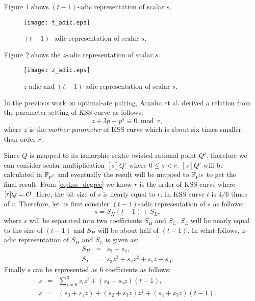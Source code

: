 Figure \ref{fig:t_adic} shows $(t-1)$-adic representation of scalar $s$. 
\begin{figure}[!ht]
\centering
\texttt{[image: t\_adic.eps]}
\caption{$(t-1)$ -adic representation of scalar $s$.}
\label{fig:t_adic}
\end{figure}

Figure \ref{fig:z_adicl} shows the  $z$-adic representation of scalar $s$. 
\begin{figure}[!ht]
\centering
\texttt{[image: z\_adic.eps]}
\caption{$z$-adic and $(t-1)$-adic representation of scalar $s$.}
\label{fig:z_adicl}
\end{figure}
In the previous work on optimal-ate pairing, Aranha et al. \cite{aranha} derived a relation from the parameter setting of KSS curve as follows:
\begin{equation}\label{eq:aranha_relation}
z+3p-p^4 \equiv 0 \bmod {r},
\end{equation}
where $z$ is the \textit{mother parameter} of KSS curve which is about six times smaller than order $r$. 

Since $Q$ is mapped to its ismorphic sextic twisted rational point $Q'$, therefore we can consider scalar multiplication $[s]Q'$ where $0 \leq s < r$. $[s]Q'$ will be calculated in $\mathbb{F}_{p^3}$ and eventually the result will be mapped to $\mathbb{F}_{p^{18}}$ to get the final result. From \eqref{eq:kss_degree} we know $r$ is the order of KSS curve  where $[r]Q=\cal O$. Here, the bit size of $s$ is nearly equal to $r$. In KSS curve $t$ is  $4/6$ times of  $r$. Therefore, let us first consider $(t-1)$-adic representation of $s$ as follows:
\begin{equation}\label{eq:t-1_adic}
s =  S_H(t-1)+S_L,
\end{equation}
where $s$ will be separated into two coefficients $S_H$ and $S_L$. $S_L$ will be nearly equal to the size of $(t-1)$ and $S_H$ will be about half of $(t-1)$. 
In what follows, $z$-adic representation of $S_H$ and $S_L$ is given as:
\begin{eqnarray}\label{eq:scalar_mul_Q}
S_H & =  & s_5+ s_4,\nonumber \\
S_L & = & s_3 z^3+s_2 z^2+s_1 z+s_0.\nonumber 
\end{eqnarray}
Finally $s$ can be represented as 6 coefficients as follows:
\begin{eqnarray}\label{eq:sclar_final_rep}
s & =  & \sum_{i=0}^{3} s_iz^i + (s_4+s_5z)(t-1),\nonumber \\
s & = & (s_0+s_1z) + (s_2 +s_3z)z^2 +(s_4+s_5z)(t-1).
\end{eqnarray}

